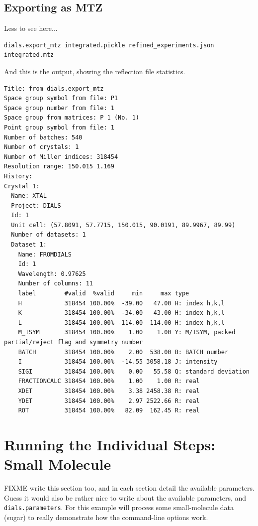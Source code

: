 \documentclass[a4paper, 11pt]{article}
\begin{document}
\subsection{Exporting as MTZ}

Less to see here...

{\small
\begin{verbatim}
dials.export_mtz integrated.pickle refined_experiments.json integrated.mtz
\end{verbatim}
}

\noindent
And this is the output, showing the reflection file statistics.

{\small
\begin{verbatim}
Title: from dials.export_mtz
Space group symbol from file: P1
Space group number from file: 1
Space group from matrices: P 1 (No. 1)
Point group symbol from file: 1
Number of batches: 540
Number of crystals: 1
Number of Miller indices: 318454
Resolution range: 150.015 1.169
History:
Crystal 1:
  Name: XTAL
  Project: DIALS
  Id: 1
  Unit cell: (57.8091, 57.7715, 150.015, 90.0191, 89.9967, 89.99)
  Number of datasets: 1
  Dataset 1:
    Name: FROMDIALS
    Id: 1
    Wavelength: 0.97625
    Number of columns: 11
    label        #valid  %valid     min     max type
    H            318454 100.00%  -39.00   47.00 H: index h,k,l
    K            318454 100.00%  -34.00   43.00 H: index h,k,l
    L            318454 100.00% -114.00  114.00 H: index h,k,l
    M_ISYM       318454 100.00%    1.00    1.00 Y: M/ISYM, packed partial/reject flag and symmetry number
    BATCH        318454 100.00%    2.00  538.00 B: BATCH number
    I            318454 100.00%  -14.55 3058.18 J: intensity
    SIGI         318454 100.00%    0.00   55.58 Q: standard deviation
    FRACTIONCALC 318454 100.00%    1.00    1.00 R: real
    XDET         318454 100.00%    3.38 2458.38 R: real
    YDET         318454 100.00%    2.97 2522.66 R: real
    ROT          318454 100.00%   82.09  162.45 R: real
\end{verbatim}
}


\section{Running the Individual Steps: Small Molecule}

FIXME write this section too, and in each section detail the available
parameters. Guess it would also be rather nice to write about the
available parameters, and \verb|dials.parameters|. For this example
will process some small-molecule data (sugar) to really demonstrate
how the command-line options work.
\end{document}
